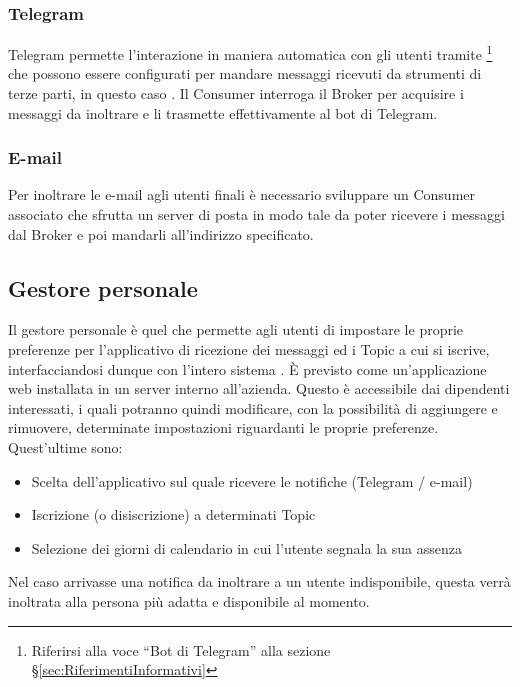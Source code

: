 		\subsubsection{Telegram}
		Telegram permette l'interazione in maniera automatica con gli utenti tramite \footnote{Riferirsi alla voce ``Bot di Telegram'' alla sezione \S\ref{sec:RiferimentiInformativi}} che possono essere configurati per mandare messaggi ricevuti da strumenti di terze parti, in questo caso \progetto.
		Il Consumer interroga il Broker per acquisire i messaggi da inoltrare e li trasmette effettivamente al bot di Telegram.
		
		\subsubsection{E-mail}
		Per inoltrare le e-mail agli utenti finali è necessario sviluppare un Consumer associato che sfrutta un server di posta in modo tale da poter ricevere i messaggi dal Broker e poi mandarli all'indirizzo specificato.
		
	
	\subsection{Gestore personale}
	Il gestore personale è quel  che permette agli utenti di impostare le proprie preferenze per l'applicativo di ricezione dei messaggi ed i Topic a cui si iscrive, interfacciandosi dunque con l'intero sistema \progetto.
	È previsto come un'applicazione web installata in un server interno all'azienda.
	Questo è accessibile dai dipendenti interessati, i quali potranno quindi modificare, con la possibilità di aggiungere e rimuovere, determinate impostazioni riguardanti le proprie preferenze.
	\newpage
	Quest'ultime sono:
	\begin{itemize}
		\item Scelta dell'applicativo sul quale ricevere le notifiche (Telegram / e-mail)
		\item Iscrizione (o disiscrizione) a determinati Topic
		\item Selezione dei giorni di calendario in cui l'utente segnala la sua assenza
	\end{itemize}
	Nel caso arrivasse una notifica da inoltrare a un utente indisponibile, questa verrà inoltrata alla persona più adatta e disponibile al momento.
	
